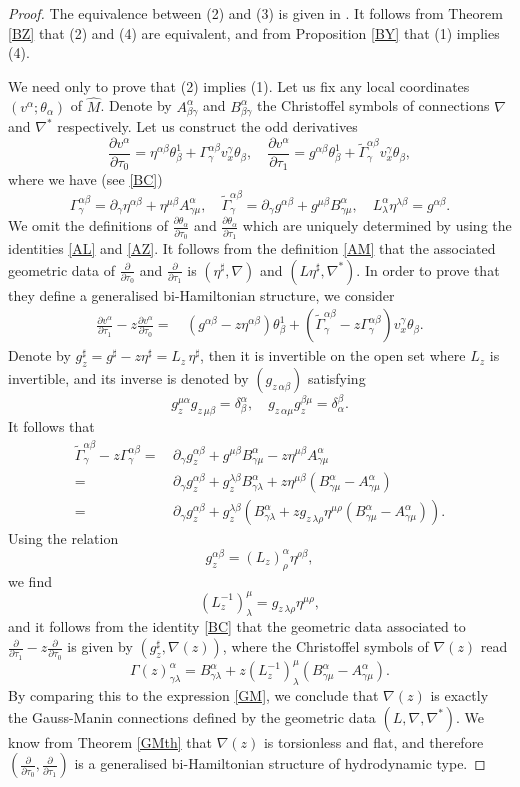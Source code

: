 \documentclass[11pt,a4paper]{amsart}
\numberwithin{equation}{section}
\newcommand{\diff}[2]{\frac{\partial #1}{\partial #2}}
\newcommand{\qa}{\alpha}
\newcommand{\qb}{\beta}
\newcommand{\qd}{\delta}
\newcommand{\qg}{\gamma}
\newcommand{\qt}{\tau}
\newcommand{\qth}{\theta}
\newcommand{\qp}{\partial}
\newcommand{\Qg}{\Gamma}
\newcommand{\ql}{\lambda}
\newcommand{\kk}[1]{\left(#1\right)}
\numberwithin{equation}{section}
\begin{document}
\begin{proof}
  The equivalence between (2) and (3) is given in \cite{AL_GM}. It follows from Theorem \ref{BZ} that (2) and (4) are equivalent, and from Proposition \ref{BY} that (1) implies (4).
  
  We need only to prove that (2) implies (1). Let us fix any local coordinates $(v^\qa;\qth_\qa)$ of $\hat M$. Denote by $A^\qa_{\qb\qg}$ and $B^\qa_{\qb\qg}$ the Christoffel symbols of connections $\nabla$ and $\nabla^*$ respectively. Let us construct the odd derivatives 
\[
\diff{v^\qa}{\qt_0} = \eta^{\qa\qb}\qth_\qb^1+\Qg^{\qa\qb}_\qg v^\qg_x\qth_\qb,\quad \diff{v^\qa}{\qt_1} = g^{\qa\qb}\qth_\qb^1+\tilde \Qg^{\qa\qb}_\qg v^\qg_x\qth_\qb,
\]
where we have (see \eqref{BC})
\[
\Qg^{\qa\qb}_\qg = \qp_\qg\eta^{\qa\qb}+\eta^{\mu\qb}A^\qa_{\qg\mu},\quad \tilde \Qg^{\qa\qb}_\qg = \qp_\qg g^{\qa\qb}+g^{\mu\qb}B^\qa_{\qg\mu},\quad L^\qa_\ql\eta^{\ql\qb} = g^{\qa\qb}.
\]
We omit the definitions of $\diff{\qth_\qa}{\qt_0}$ and $\diff{\qth_\qa}{\qt_1}$ which are uniquely determined by using the identities \eqref{AL} and \eqref{AZ}. It follows from the definition \eqref{AM} that the associated geometric data of $\diff{}{\qt_0}$ and $\diff{}{\qt_1}$ is $(\eta^\sharp,\nabla)$ and $(L\eta^\sharp,\nabla^*)$.
In order to prove that they define a generalised bi-Hamiltonian structure, we consider 
\begin{align*}
\diff{v^\qa}{\qt_1}-z\diff{v^\qa}{\qt_0} =&\,\left(g^{\qa\qb}-z\eta^{\qa\qb}\right)\qth_\qb^1+ \kk{\tilde\Qg^{\qa\qb}_\qg-z \Qg^{\qa\qb}_\qg} v^\qg_x\qth_\qb.
\end{align*}
Denote by $g_z^\sharp = g^\sharp-z\eta^\sharp = L_z\,\eta^\sharp$, then it is invertible on the open set where $L_z$ is invertible, and its inverse is denoted by $(g_{z\,\qa\qb})$ satisfying
\[
g_z^{\mu\qa}g_{z\,\mu\qb} = \qd^\qa_\qb,\quad g_{z\,\qa\mu}g_z^{\qb\mu} = \qd^\qb_\qa.
\]
It follows that 
\begin{align*}
  \tilde\Qg^{\qa\qb}_\qg-z \Qg^{\qa\qb}_\qg = &\,\qp_\qg g^{\qa\qb}_z+g^{\mu\qb}B^\qa_{\qg\mu}-z\eta^{\mu\qb}A^\qa_{\qg\mu}\\
  =&\,\qp_\qg g^{\qa\qb}_z+g^{\ql\qb}_zB^\qa_{\qg\ql}+z\eta^{\mu\qb}\kk{B^\qa_{\qg\mu}-A^\qa_{\qg\mu}}\\
  =&\,\qp_\qg g^{\qa\qb}_z+g^{\ql\qb}_z\kk{B^\qa_{\qg\ql}+z g_{z\,\ql\rho}\eta^{\mu\rho}\kk{B^\qa_{\qg\mu}-A^\qa_{\qg\mu}}}.
\end{align*}
Using the relation 
\[
g_z^{\qa\qb} = (L_z)^\qa_\rho \eta^{\rho\qb},
\]
we find 
\[
(L_z^{-1})^\mu_\ql =  g_{z\,\ql\rho}\eta^{\mu\rho},
\]
and it follows from the identity \eqref{BC} that the geometric data associated to $\diff{}{\qt_1}-z\diff{}{\qt_0}$ is given by $(g_z^\sharp,\nabla(z))$, where the Christoffel symbols of $\nabla(z)$ read 
\[
\Qg(z)^{\qa}_{\qg\ql} = B^\qa_{\qg\ql}+z (L_z^{-1})^\mu_\ql\kk{B^\qa_{\qg\mu}-A^\qa_{\qg\mu}}.
\]
By comparing this to the expression \eqref{GM}, we conclude that $\nabla(z)$ is exactly the Gauss-Manin connections defined by the geometric data $(L,\nabla,\nabla^*)$. We know from Theorem \ref{GMth} that $\nabla(z)$ is torsionless and flat, and therefore $(\diff{}{\qt_0},\diff{}{\qt_1})$ is a generalised bi-Hamiltonian structure of hydrodynamic type.
\end{proof}
\end{document}
